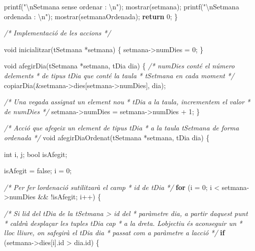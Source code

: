 \documentclass[
]{book}
\newenvironment{Shaded}{\begin{snugshade}}{\end{snugshade}}
\newcommand{\CommentTok}[1]{\textcolor[rgb]{0.56,0.35,0.01}{\textit{#1}}}
\newcommand{\ControlFlowTok}[1]{\textcolor[rgb]{0.13,0.29,0.53}{\textbf{#1}}}
\newcommand{\DataTypeTok}[1]{\textcolor[rgb]{0.13,0.29,0.53}{#1}}
\newcommand{\DecValTok}[1]{\textcolor[rgb]{0.00,0.00,0.81}{#1}}
\newcommand{\NormalTok}[1]{#1}
\newcommand{\SpecialCharTok}[1]{\textcolor[rgb]{0.00,0.00,0.00}{#1}}
\newcommand{\StringTok}[1]{\textcolor[rgb]{0.31,0.60,0.02}{#1}}
\begin{document}
\begin{Shaded}
\begin{Highlighting}[]
\NormalTok{    printf(}\StringTok{"}\SpecialCharTok{\textbackslash{}n}\StringTok{Setmana sense ordenar : }\SpecialCharTok{\textbackslash{}n}\StringTok{"}\NormalTok{);}
\NormalTok{    mostrar(setmana);}
\NormalTok{    printf(}\StringTok{"}\SpecialCharTok{\textbackslash{}n}\StringTok{Setmana ordenada : }\SpecialCharTok{\textbackslash{}n}\StringTok{"}\NormalTok{);}
\NormalTok{    mostrar(setmanaOrdenada);}
    \ControlFlowTok{return} \DecValTok{0}\NormalTok{;}
\NormalTok{\}}

\CommentTok{/* Implementació de les accions */}

\DataTypeTok{void}\NormalTok{ inicialitzar(tSetmana *setmana) \{}
\NormalTok{    setmana{-}\textgreater{}numDies = }\DecValTok{0}\NormalTok{;}
\NormalTok{\}}

\DataTypeTok{void}\NormalTok{ afegirDia(tSetmana *setmana, tDia dia) \{}
    \CommentTok{/* numDies conté el número d\textquotesingle{}elements }
\CommentTok{     * de tipus tDia que conté la taula }
\CommentTok{     * tSetmana en cada moment }
\CommentTok{     */}
\NormalTok{    copiarDia(\&setmana{-}\textgreater{}dies[setmana{-}\textgreater{}numDies], dia);}

    \CommentTok{/* Una vegada assignat un element nou }
\CommentTok{     * tDia a la taula, incrementem el valor }
\CommentTok{     * de numDies }
\CommentTok{     */}
\NormalTok{    setmana{-}\textgreater{}numDies = setmana{-}\textgreater{}numDies + }\DecValTok{1}\NormalTok{;}
\NormalTok{\}}

\CommentTok{/* Acció que afegeix un element de tipus tDia}
\CommentTok{ * a la taula tSetmana de forma ordenada }
\CommentTok{ */}
\DataTypeTok{void}\NormalTok{ afegirDiaOrdenat(tSetmana *setmana, tDia dia) \{}
    
    \DataTypeTok{int}\NormalTok{ i, j;}
    \DataTypeTok{bool}\NormalTok{ isAfegit;}
    
\NormalTok{    isAfegit = false;}
\NormalTok{    i = }\DecValTok{0}\NormalTok{;}
    
    \CommentTok{/* Per fer l\textquotesingle{}ordenació s\textquotesingle{}utilitzarà el camp}
\CommentTok{     * id de tDia }
\CommentTok{     */}
    \ControlFlowTok{for}\NormalTok{ (i = }\DecValTok{0}\NormalTok{; i \textless{} setmana{-}\textgreater{}numDies \&\& !isAfegit; i++) \{}
        
        \CommentTok{/* Si l\textquotesingle{}id del tDia de la tSetmana \textgreater{} id del}
\CommentTok{         * paràmetre dia, a partir d\textquotesingle{}aquest punt }
\CommentTok{         * caldrà desplaçar les tuples tDia cap }
\CommentTok{         * a la dreta. L\textquotesingle{}objectiu és aconseguir un}
\CommentTok{         * lloc lliure, on s\textquotesingle{}afegirà el tDia dia }
\CommentTok{         * passat com a paràmetre a l\textquotesingle{}acció}
\CommentTok{         */}
        \ControlFlowTok{if}\NormalTok{ (setmana{-}\textgreater{}dies[i].id \textgreater{} dia.id) \{}
            

\end{Highlighting}
\end{Shaded}
\end{document}
